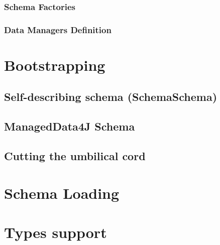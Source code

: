 \subsubsection{Schema Factories}\label{Schema Factories}

\subsubsection{Data Managers Definition}\label{Data Managers Definition}

\section{Bootstrapping}\label{sec:Bootstrapping}

\subsection{Self-describing schema (SchemaSchema)}\label{sec:SchemaSchema}

\subsection{ManagedData4J Schema}\label{sec:ManagedData4J Schema}


\subsection{Cutting the umbilical cord}\label{subsec:Cutting the umbilical cord}

\section{Schema Loading}\label{sec:Schema Loading}

\section{Types support}\label{sec:Implementation Types}

